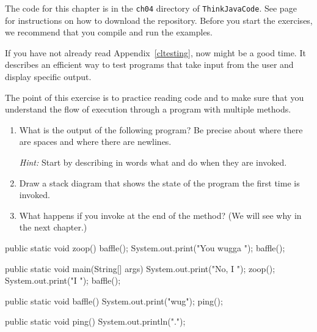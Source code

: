 The code for this chapter is in the {\tt ch04} directory of {\tt ThinkJavaCode}.
See page~\pageref{code} for instructions on how to download the repository.
Before you start the exercises, we recommend that you compile and run the examples.

If you have not already read Appendix~\ref{cltesting}, now might be a good time.
It describes an efficient way to test programs that take input from the user and display specific output.


\begin{exercise}

The point of this exercise is to practice reading code and to make sure that you understand the flow of execution through a program with multiple methods.

\begin{enumerate}

\item What is the output of the following program?
Be precise about where there are spaces and where there are newlines.

{\it Hint:} Start by describing in words what  and  do when they are invoked.

\item Draw a stack diagram that shows the state of the program the first time  is invoked.

\item What happens if you invoke  at the end of the  method? (We will see why in the next chapter.)

\end{enumerate}

\begin{code}
public static void zoop() {
    baffle();
    System.out.print("You wugga ");
    baffle();
}

public static void main(String[] args) {
    System.out.print("No, I ");
    zoop();
    System.out.print("I ");
    baffle();
}

public static void baffle() {
    System.out.print("wug");
    ping();
}

public static void ping() {
    System.out.println(".");
}
\end{code}

\end{exercise}




